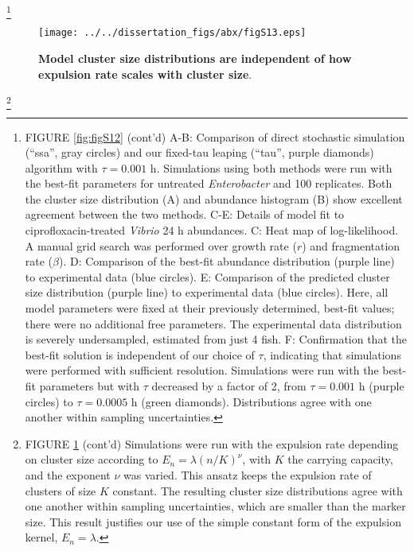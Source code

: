 {{{{{{{{\let\thefootnote\relax\footnote{FIGURE \ref{fig:figS12} (cont'd) A-B: Comparison of direct stochastic simulation (``ssa'', gray circles) and our fixed-tau leaping (``tau'', purple diamonds) algorithm with $\tau = 0.001$ h. Simulations using both methods were run with the best-fit parameters for untreated \textit{Enterobacter} and 100 replicates. Both the cluster size distribution (A) and abundance histogram (B) show excellent agreement between the two methods. C-E: Details of model fit to ciprofloxacin-treated \textit{Vibrio} 24 h abundances. C: Heat map of log-likelihood. A manual grid search was performed over growth rate ($r$) and fragmentation rate ($\beta$). D: Comparison of the best-fit abundance distribution (purple line) to experimental data (blue circles). E: Comparison of the predicted cluster size distribution (purple line) to experimental data (blue circles). Here, all model parameters were fixed at their previously determined, best-fit values; there were no additional free parameters. The experimental data distribution is severely undersampled, estimated from just 4 fish. F: Confirmation that the best-fit solution is independent of our choice of $\tau$, indicating that simulations were performed with sufficient resolution. Simulations were run with the best-fit parameters but with $\tau$ decreased by a factor of 2, from $\tau=0.001$ h (purple circles) to $\tau = 0.0005$ h (green diamonds). Distributions agree with one another within sampling uncertainties.}


\begin{figure}[H]
	\centerline{
		\texttt{[image: ../../dissertation\_figs/abx/figS13.eps]}} 
	\caption{\textbf{Model cluster size distributions are independent of how expulsion rate scales with cluster size}.}
	\label{fig:figS13}
\end{figure}

{\let\thefootnote\relax\footnote{FIGURE \ref{fig:figS13} (cont'd) Simulations were run with the expulsion rate depending on cluster size according to $E_n = \lambda (n/K)^{\nu}$, with $K$ the carrying capacity, and the exponent $\nu$ was varied. This ansatz keeps the expulsion rate of clusters of size $K$ constant. The resulting cluster size distributions agree with one another within sampling uncertainties, which are smaller than the marker size. This result justifies our use of the simple constant form of the expulsion kernel, $E_n = \lambda$.}

}}}}}}}}}
